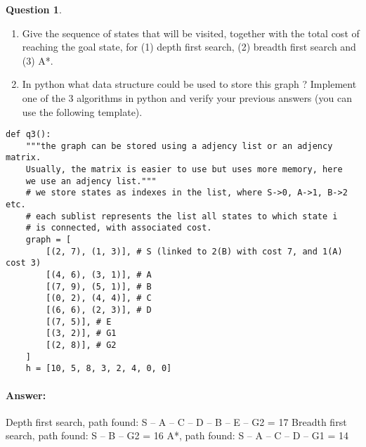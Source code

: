 \documentclass[11pt,a4paper]{article}
\theoremstyle{definition}%
\newtheorem{Q}{Question}[] %
\newcommand{\reponse}[1]{%
\ifthenelse {\boolean{corrige}} {\paragraph{Answer:} \color{darkblue}   #1\color{black}} {}
}
\begin{document}
\begin{Q}
\begin{enumerate}
    \item Give the sequence of states that will be visited, together with the total cost 
        of reaching the goal state, for (1) depth first search, (2) breadth first search 
        and (3) A*.
    \item In python what data structure could be used to store this graph ? 
        Implement one of the 3 algorithms in python and verify your previous answers 
        (you can use the following template).
\end{enumerate}

\begin{verbatim}
def q3():
    """the graph can be stored using a adjency list or an adjency matrix.
    Usually, the matrix is easier to use but uses more memory, here 
    we use an adjency list."""
    # we store states as indexes in the list, where S->0, A->1, B->2 etc.
    # each sublist represents the list all states to which state i 
    # is connected, with associated cost.
    graph = [
        [(2, 7), (1, 3)], # S (linked to 2(B) with cost 7, and 1(A) cost 3)
        [(4, 6), (3, 1)], # A
        [(7, 9), (5, 1)], # B
        [(0, 2), (4, 4)], # C
        [(6, 6), (2, 3)], # D
        [(7, 5)], # E
        [(3, 2)], # G1
        [(2, 8)], # G2
    ]
    h = [10, 5, 8, 3, 2, 4, 0, 0]

\end{verbatim}


\reponse{
Depth first search, path found: S – A – C – D – B – E – G2 = 17
Breadth first search, path found: S – B – G2 = 16
A*, path found: S – A – C – D – G1 = 14
}
\end{Q}
\end{document}
